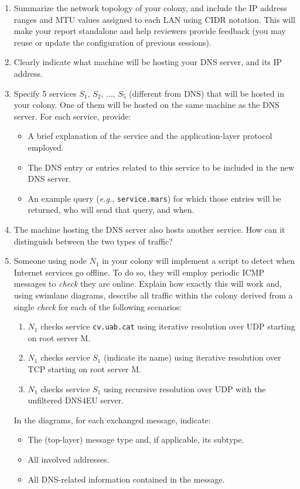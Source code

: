 \begin{enumerate}[itemsep=0.1cm]
\item Summarize the network topology of your colony, and include the IP address ranges and MTU values assigned to each LAN using CIDR notation. This will make your report standalone and help reviewers provide feedback (you may reuse or update the configuration of previous sessions).

\item Clearly indicate what machine will be hosting your DNS server, and its IP address.

\item Specify 5 services $S_1,\,S_2,\,\ldots,\,S_5$ (different from DNS) that will be hosted in your colony. One of them will be hosted on the same machine as the DNS server. For each service, provide:
    \begin{itemize}[itemsep=0.1cm]
    \item A brief explanation of the service and the application-layer protocol employed.
    \item The DNS entry or entries related to this service to be included in the new DNS server.
    \item An example query (\textit{e.g.}, \texttt{service.mars}) for which those entries will be returned, who will send that query, and when.
    \end{itemize}

\item The machine hosting the DNS server also hosts another service. How can it distinguish between the two types of traffic?

\item Someone using node $N_1$ in your colony will implement a script to detect when Internet services go offline. To do so, they will employ periodic ICMP messages to \textit{check} they are online. Explain how exactly this will work and, using swimlane diagrams, describe all traffic within the colony derived from a single \textit{check} for each of the following scenarios:
    \begin{enumerate}[itemsep=0.1cm]
    \item $N_1$ checks service \texttt{cv.uab.cat} using iterative resolution over UDP starting on root server M.
    \item $N_1$ checks service $S_1$ (indicate its name) using iterative resolution over TCP starting on root server M.
    \item $N_1$ checks service $S_1$ using recursive resolution over UDP with the unfiltered DNS4EU server.
    \end{enumerate}

In the diagrams, for each exchanged message, indicate:
    \begin{itemize}
    \item The (top-layer) message type and, if applicable, its subtype.
    \item All involved addresses.
    \item All DNS-related information contained in the message.
    \end{itemize}

\end{enumerate}

